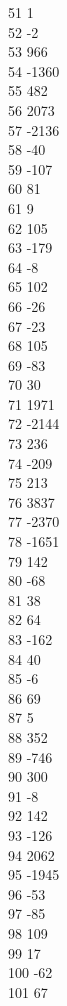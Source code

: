 { 51	1 \\
 52	-2 \\
 53	966 \\
 54	-1360 \\
 55	482 \\
 56	2073 \\
 57	-2136 \\
 58	-40 \\
 59	-107 \\
 60	81 \\
 61	9 \\
 62	105 \\
 63	-179 \\
 64	-8 \\
 65	102 \\
 66	-26 \\
 67	-23 \\
 68	105 \\
 69	-83 \\
 70	30 \\
 71	1971 \\
 72	-2144 \\
 73	236 \\
 74	-209 \\
 75	213 \\
 76	3837 \\
 77	-2370 \\
 78	-1651 \\
 79	142 \\
 80	-68 \\
 81	38 \\
 82	64 \\
 83	-162 \\
 84	40 \\
 85	-6 \\
 86	69 \\
 87	5 \\
 88	352 \\
 89	-746 \\
 90	300 \\
 91	-8 \\
 92	142 \\
 93	-126 \\
 94	2062 \\
 95	-1945 \\
 96	-53 \\
 97	-85 \\
 98	109 \\
 99	17 \\
 100	-62 \\
 101	67 \\
}
